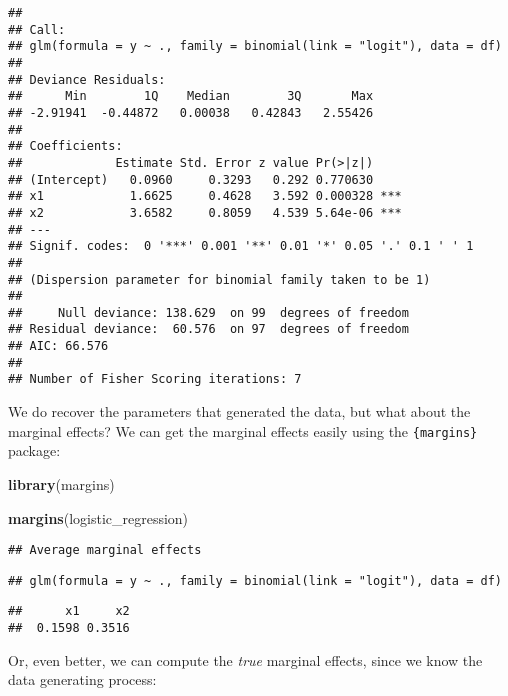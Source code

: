 \documentclass[
]{article}
\newenvironment{Shaded}{\begin{snugshade}}{\end{snugshade}}
\newcommand{\KeywordTok}[1]{\textcolor[rgb]{0.13,0.29,0.53}{\textbf{#1}}}
\newcommand{\NormalTok}[1]{#1}
\begin{document}
\begin{verbatim}
## 
## Call:
## glm(formula = y ~ ., family = binomial(link = "logit"), data = df)
## 
## Deviance Residuals: 
##      Min        1Q    Median        3Q       Max  
## -2.91941  -0.44872   0.00038   0.42843   2.55426  
## 
## Coefficients:
##             Estimate Std. Error z value Pr(>|z|)    
## (Intercept)   0.0960     0.3293   0.292 0.770630    
## x1            1.6625     0.4628   3.592 0.000328 ***
## x2            3.6582     0.8059   4.539 5.64e-06 ***
## ---
## Signif. codes:  0 '***' 0.001 '**' 0.01 '*' 0.05 '.' 0.1 ' ' 1
## 
## (Dispersion parameter for binomial family taken to be 1)
## 
##     Null deviance: 138.629  on 99  degrees of freedom
## Residual deviance:  60.576  on 97  degrees of freedom
## AIC: 66.576
## 
## Number of Fisher Scoring iterations: 7
\end{verbatim}

We do recover the parameters that generated the data, but what about the marginal effects? We can
get the marginal effects easily using the \texttt{\{margins\}} package:

\begin{Shaded}
\begin{Highlighting}[]
\KeywordTok{library}\NormalTok{(margins)}

\KeywordTok{margins}\NormalTok{(logistic\_regression)}
\end{Highlighting}
\end{Shaded}

\begin{verbatim}
## Average marginal effects
\end{verbatim}

\begin{verbatim}
## glm(formula = y ~ ., family = binomial(link = "logit"), data = df)
\end{verbatim}

\begin{verbatim}
##      x1     x2
##  0.1598 0.3516
\end{verbatim}

Or, even better, we can compute the \emph{true} marginal effects, since we know the data
generating process:
\end{document}
